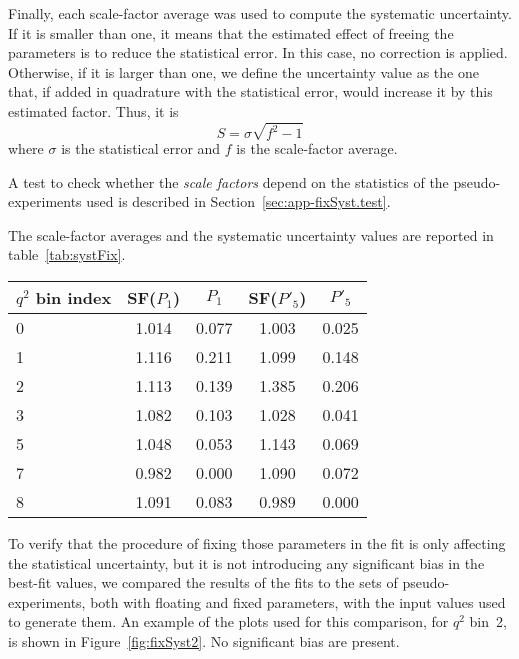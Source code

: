 Finally, each scale-factor average was used to compute the systematic uncertainty.
If it is smaller than one, it means that the estimated effect of freeing the parameters is to reduce the statistical error.
In this case, no correction is applied.
Otherwise, if it is larger than one, we define the uncertainty value as the one that, if added in quadrature with the statistical error, would increase it by this estimated factor.
Thus, it is
\begin{equation} \label{eq:fix.syst.def}
S = \sigma \sqrt{f^2-1}
\end{equation}
where $\sigma$ is the statistical error and $f$ is the scale-factor average.

A test to check whether the \textit{scale factors} depend on the statistics of the pseudo-experiments used is described in Section~\ref{sec:app-fixSyst.test}.

The scale-factor averages and the systematic uncertainty values are reported in table~\ref{tab:systFix}.

\begin{table*}[!htb]
  \caption{Scale-factor average values and systematic uncertainties computed to compensate the statistical error reduction introduced fixing some PDF parameters\label{tab:systFix}}
  \begin{center}
    \begin{tabular}{l|cc|cc}
      $q^2$ bin index & SF($P_1$)  & $P_1$  & SF($P'_5$) & $P'_5$ \\
      \hline
      0 & 1.014 & 0.077 & 1.003 & 0.025  \\
      1 & 1.116 & 0.211 & 1.099 & 0.148  \\
      2 & 1.113 & 0.139 & 1.385 & 0.206  \\
      3 & 1.082 & 0.103 & 1.028 & 0.041  \\
      5 & 1.048 & 0.053 & 1.143 & 0.069  \\
      7 & 0.982 & 0.000 & 1.090 & 0.072  \\
      8 & 1.091 & 0.083 & 0.989 & 0.000  \\
    \end{tabular}
  \end{center}
\end{table*}

To verify that the procedure of fixing those parameters in the fit is only affecting the statistical uncertainty, but it is not introducing any significant bias in the best-fit values, we compared the results of the fits to the sets of pseudo-experiments, both with floating and fixed parameters, with the input values used to generate them.
An example of the plots used for this comparison, for $q^2$ bin~2, is shown in Figure~\ref{fig:fixSyst2}.
No significant bias are present.

